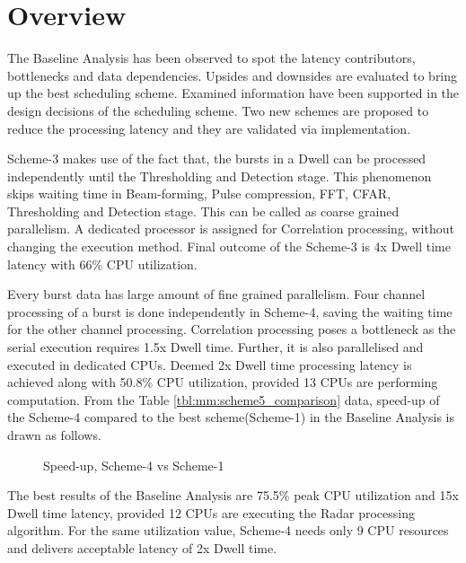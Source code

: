 \section{Overview}
The Baseline Analysis has been observed to spot the latency contributors, bottlenecks and data dependencies. Upsides and downsides are evaluated to bring up the best scheduling scheme. Examined information have been supported in the design decisions of the scheduling scheme. Two new schemes are proposed to reduce the processing latency and they are validated via implementation. \vspace*{0.2cm}

Scheme-3 makes use of the fact that, the bursts in a Dwell can be processed independently until the Thresholding and Detection stage. This phenomenon skips waiting time in Beam-forming, Pulse compression, FFT, CFAR, Thresholding and Detection stage. This can be called as coarse grained parallelism. A dedicated processor is assigned for Correlation processing, without changing the execution method. Final outcome of the Scheme-3 is 4x Dwell time latency with 66\% CPU utilization. \vspace*{0.2cm}

Every burst data has large amount of fine grained parallelism. Four channel processing of a burst is done independently in Scheme-4, saving the waiting time for the other channel processing.  Correlation processing poses a bottleneck as the serial execution requires 1.5x Dwell time. Further, it is also parallelised and executed in dedicated CPUs. Deemed 2x Dwell time processing latency is achieved along with 50.8\% CPU utilization, provided 13 CPUs are performing computation. From the Table \ref{tbl:mm:scheme5_comparison} data, speed-up of the Scheme-4 compared to the best scheme(Scheme-1) in the Baseline Analysis is drawn as follows. \\

\begin{figure}[h!]
\centering
\caption{Speed-up, Scheme-4 vs Scheme-1}
\label{mm:scheme5_speedup}
\end{figure}

The best results of the Baseline Analysis are 75.5\% peak CPU utilization and 15x Dwell time latency, provided 12 CPUs are executing the Radar processing algorithm. For the same utilization value, Scheme-4 needs only 9 CPU resources and delivers acceptable latency of 2x Dwell time.

